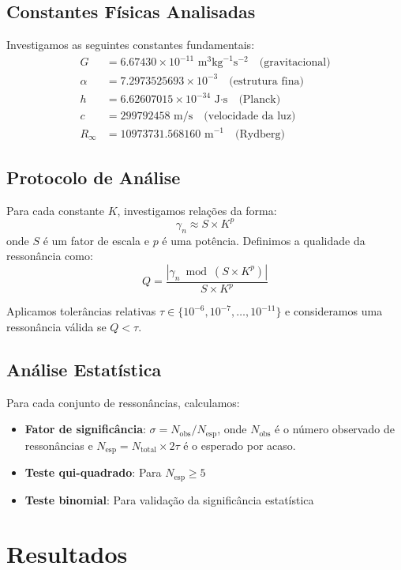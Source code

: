 \documentclass[11pt,a4paper]{article}
\begin{document}
\subsection{Constantes Físicas Analisadas}
Investigamos as seguintes constantes fundamentais:
\begin{align}
G &= 6.67430 \times 10^{-11} \text{ m}^3\text{kg}^{-1}\text{s}^{-2} \quad \text{(gravitacional)}\\
\alpha &= 7.2973525693 \times 10^{-3} \quad \text{(estrutura fina)}\\
h &= 6.62607015 \times 10^{-34} \text{ J·s} \quad \text{(Planck)}\\
c &= 299792458 \text{ m/s} \quad \text{(velocidade da luz)}\\
R_\infty &= 10973731.568160 \text{ m}^{-1} \quad \text{(Rydberg)}
\end{align}

\subsection{Protocolo de Análise}
Para cada constante $K$, investigamos relações da forma:
$$\gamma_n \approx S \times K^p$$
onde $S$ é um fator de escala e $p$ é uma potência. Definimos a qualidade da ressonância como:
$$Q = \frac{|\gamma_n \bmod (S \times K^p)|}{S \times K^p}$$

Aplicamos tolerâncias relativas $\tau \in \{10^{-6}, 10^{-7}, \ldots, 10^{-11}\}$ e consideramos uma ressonância válida se $Q < \tau$.

\subsection{Análise Estatística}
Para cada conjunto de ressonâncias, calculamos:
\begin{itemize}
\item \textbf{Fator de significância}: $\sigma = N_{\text{obs}}/N_{\text{esp}}$, onde $N_{\text{obs}}$ é o número observado de ressonâncias e $N_{\text{esp}} = N_{\text{total}} \times 2\tau$ é o esperado por acaso.
\item \textbf{Teste qui-quadrado}: Para $N_{\text{esp}} \geq 5$
\item \textbf{Teste binomial}: Para validação da significância estatística
\end{itemize}

\section{Resultados}
\end{document}
